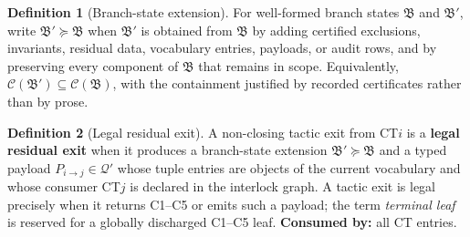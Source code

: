 \documentclass[
  11pt,
]{article}
\theoremstyle{definition}
\newtheorem{definition}{Definition}[section]
\begin{document}
\begin{definition}[Branch-state extension]\label{def:branch-state-extension}
For well-formed branch states \(\mathfrak B\) and \(\mathfrak B'\),
write \(\mathfrak B'\succeq\mathfrak B\) when \(\mathfrak B'\) is
obtained from \(\mathfrak B\) by adding certified exclusions,
invariants, residual data, vocabulary entries, payloads, or audit rows,
and by preserving every component of \(\mathfrak B\) that remains in
scope.  Equivalently, \(\mathcal C(\mathfrak B')\subseteq
\mathcal C(\mathfrak B)\), with the containment justified by recorded
certificates rather than by prose.
\end{definition}

\begin{definition}[Legal residual exit]\label{def:legal-residual-exit}
A non-closing tactic exit from CT\(i\) is a \textbf{legal residual exit} when
it produces a branch-state extension \(\mathfrak B'\succeq\mathfrak B\)
and a typed payload \(P_{i\to j}\in\mathcal Q'\) whose tuple entries are
objects of the current vocabulary and whose consumer CT\(j\) is declared
in the interlock graph. A tactic exit is legal precisely when it returns
C1--C5 or emits such a payload; the term \emph{terminal leaf} is reserved
for a globally discharged C1--C5 leaf. \textbf{Consumed by:} all CT entries.
\end{definition}
\end{document}
